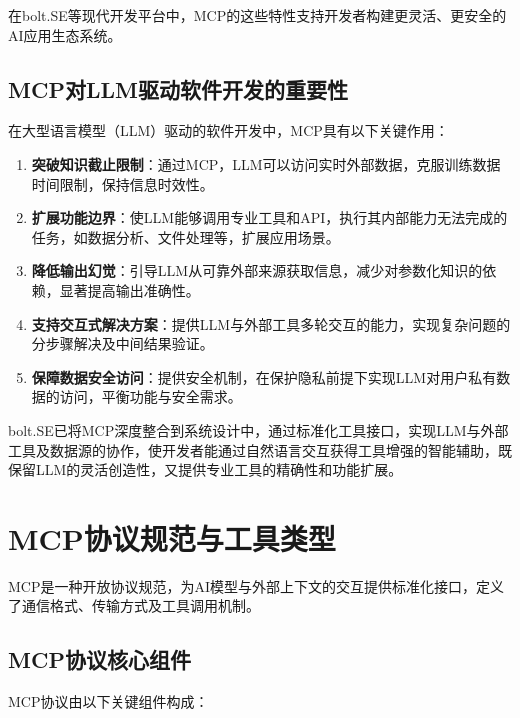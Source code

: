 在bolt.SE等现代开发平台中，MCP的这些特性支持开发者构建更灵活、更安全的AI应用生态系统。

\subsection{MCP对LLM驱动软件开发的重要性}
在大型语言模型（LLM）驱动的软件开发中，MCP具有以下关键作用：

\begin{enumerate}
  \item \textbf{突破知识截止限制}：通过MCP，LLM可以访问实时外部数据，克服训练数据时间限制，保持信息时效性。
  
  \item \textbf{扩展功能边界}：使LLM能够调用专业工具和API，执行其内部能力无法完成的任务，如数据分析、文件处理等，扩展应用场景。
  
  \item \textbf{降低输出幻觉}：引导LLM从可靠外部来源获取信息，减少对参数化知识的依赖，显著提高输出准确性。
  
  \item \textbf{支持交互式解决方案}：提供LLM与外部工具多轮交互的能力，实现复杂问题的分步骤解决及中间结果验证。
  
  \item \textbf{保障数据安全访问}：提供安全机制，在保护隐私前提下实现LLM对用户私有数据的访问，平衡功能与安全需求。
\end{enumerate}

bolt.SE已将MCP深度整合到系统设计中，通过标准化工具接口，实现LLM与外部工具及数据源的协作，使开发者能通过自然语言交互获得工具增强的智能辅助，既保留LLM的灵活创造性，又提供专业工具的精确性和功能扩展。

\section{MCP协议规范与工具类型}

MCP是一种开放协议规范，为AI模型与外部上下文的交互提供标准化接口，定义了通信格式、传输方式及工具调用机制\cite{mcpspec2023}。

\subsection{MCP协议核心组件}

MCP协议由以下关键组件构成：

